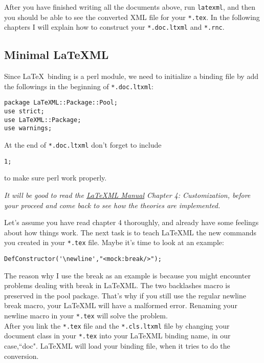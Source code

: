 \documentclass{article}
\begin{document}
\noindent After you have finished writing all the documents above, run \texttt{latexml}, and then you should be able to see the converted XML file for your \texttt{*.tex}. In the following chapters I will explain how to construct your \texttt{*.doc.ltxml} and \texttt{*.rnc}.

\subsection{Minimal \LaTeX ML}
Since \LaTeX\ binding is a perl module, we need to initialize a binding file by add the followings in the beginning of \texttt{*.doc.ltxml}: \\
\begin{lstlisting}
package LaTeXML::Package::Pool;
use strict;
use LaTeXML::Package;
use warnings;
\end{lstlisting}
At the end of \texttt{*.doc.ltxml} don't forget to include \\
\begin{lstlisting}
1;
\end{lstlisting}
to make sure perl work properly.

\begin{tcolorbox}
{\emph{It will be good to read the \href{http://dlmf.nist.gov/LaTeXML/manual.pdf}{\LaTeX ML Manual} Chapter 4: Customization, before
your proceed and come back to see how the theories are implemented.}}
\end{tcolorbox}

\noindent Let's assume you have read chapter 4 thoroughly, and already have some feelings about how things work.  The next task is to teach \LaTeX ML the new commands you created in your \texttt{*.tex} file. Maybe it's time to look at an example:\\

\begin{lstlisting}
DefConstructor('\newline',"<mock:break/>");
\end{lstlisting}

\noindent The reason why I use the break as an example is because you might encounter problems dealing with break in \LaTeX ML. The two backlashes macro is preserved in the pool package. That's why if you still use the regular newline break macro, your \LaTeX ML will have a malformed error. Renaming your newline macro in your \texttt{*.tex} will solve the problem.\\

\noindent After you link the \texttt{*.tex} file and the \texttt{*.cls.ltxml} file by changing your document class in your \texttt{*.tex} into your \LaTeX ML binding name, in our case,``doc". \LaTeX ML will load your binding file, when it tries to do the conversion.\\
\end{document}
